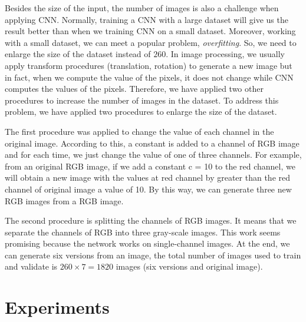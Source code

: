 \documentclass[10pt]{article}
\begin{document}
Besides the size of the input, the number of images is also a challenge when applying CNN. Normally, training a CNN with a large dataset will give us the result better than when we training CNN on a small dataset. Moreover, working with a small dataset, we can meet a popular problem, \textit{overfitting}. So, we need to enlarge the size of the dataset instead of $260$. In image processing, we usually apply transform procedures (translation, rotation) to generate a new image but in fact, when we compute the value of the pixels, it does not change while CNN computes the values of the pixels. Therefore, we have applied two other procedures to increase the number of images in the dataset. To address this problem, we have applied two procedures to enlarge the size of the dataset.

The first procedure was applied to change the value of each
channel in the original image. According to this, a constant is
added to a channel of RGB image and for each time, we just
change the value of one of three channels. For example, from
an original RGB image, if we add a constant c = 10 to the
red channel, we will obtain a new image with the values at
red channel by greater than the red channel of original image
a value of 10. By this way, we can generate three new RGB
images from a RGB image.

The second procedure is splitting the channels of RGB
images. It means that we separate the channels of RGB into
three gray-scale images. This work seems promising because
the network works on single-channel images. At the end, we
can generate six versions from an image, the total number of
images used to train and validate is $260 \times 7 = 1820$ images
(six versions and original image).

\section{Experiments}
\end{document}

